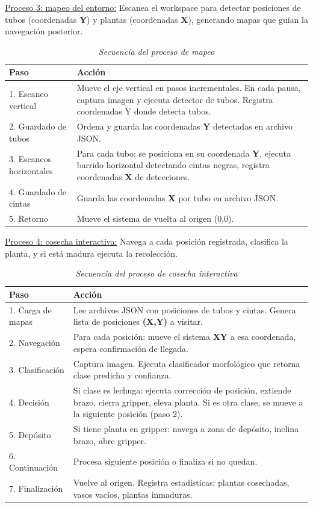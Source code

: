 \underline{Proceso 3: mapeo del entorno:} Escanea el workspace para detectar posiciones de tubos (coordenadas \textbf{Y}) y plantas (coordenadas \textbf{X}), generando mapas que guían la navegación posterior.

\begin{table}[H]
\centering
\small
\begin{tabular}{|l|p{10cm}|}
\hline
Paso & Acción \\
\hline
1. Escaneo vertical & Mueve el eje vertical en pasos incrementales. En cada pausa, captura imagen y ejecuta detector de tubos. Registra coordenadas Y donde detecta tubos. \\
\hline
2. Guardado de tubos & Ordena y guarda las coordenadas \textbf{Y} detectadas en archivo JSON. \\
\hline
3. Escaneos horizontales & Para cada tubo: se posiciona en su coordenada  \textbf{Y}, ejecuta barrido horizontal detectando cintas negras, registra coordenadas \textbf{X} de detecciones. \\
\hline
4. Guardado de cintas & Guarda las coordenadas \textbf{X} por tubo en archivo JSON. \\
\hline
5. Retorno & Mueve el sistema de vuelta al origen (0,0). \\
\hline
\end{tabular}
\caption{\textit{Secuencia del proceso de mapeo}}
\label{tab:proceso_mapeo}
\end{table}

\underline{Proceso 4: cosecha interactiva:} Navega a cada posición registrada, clasifica la planta, y si está madura ejecuta la recolección.

\begin{table}[H]
\centering
\small
\begin{tabular}{|l|p{10cm}|}
\hline
Paso & Acción \\
\hline
1. Carga de mapas & Lee archivos JSON con posiciones de tubos y cintas. Genera lista de posiciones \textbf{(X,Y)} a visitar. \\
\hline
2. Navegación & Para cada posición: mueve el sistema \textbf{XY} a esa coordenada, espera confirmación de llegada. \\
\hline
3. Clasificación & Captura imagen. Ejecuta clasificador morfológico que retorna clase predicha y confianza. \\
\hline
4. Decisión & Si clase es lechuga: ejecuta corrección de posición, extiende brazo, cierra gripper, eleva planta. Si es otra clase, se mueve a la siguiente posición (paso 2). \\
\hline
5. Depósito & Si tiene planta en gripper: navega a zona de depósito, inclina brazo, abre gripper. \\
\hline
6. Continuación & Procesa siguiente posición o finaliza si no quedan. \\
\hline
7. Finalización & Vuelve al origen. Registra estadísticas: plantas cosechadas, vasos vacíos, plantas inmaduras. \\
\hline
\end{tabular}
\caption{\textit{Secuencia del proceso de cosecha interactiva}}
\label{tab:proceso_cosecha}
\end{table}

